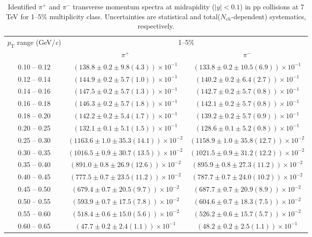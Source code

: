\begin{table}
\caption{Identified $\pi^{+}$ and $\pi^{-}$  transverse momentum spectra at midrapidity ($|y|<0.1$) in pp collisions at 7 TeV for 1--5\% multiplicity class. Uncertainties are statistical and total($N_{ch}$-dependent) systematics, respectively.}
\label{tab:PionPlus_PionMinus_1to5}
\begin{center}
\begin{tabular}{ c | c c }
\hline
\multirow{2}{*}{$p_{\mathrm{T}}$ range (GeV/\textit{c})} & \multicolumn{2}{c}{1--5\%} \\ & $\pi^{+}$& $\pi^{-}$\\ 
\hline
0.10 -- 0.12 & $(138.8\pm0.2\pm9.8(4.3))\times10^{-1}$ & $(133.8\pm0.2\pm10.5(6.9))\times10^{-1}$ \\ 
0.12 -- 0.14 & $(144.9\pm0.2\pm5.7(1.0))\times10^{-1}$ & $(140.2\pm0.2\pm6.4(2.7))\times10^{-1}$ \\ 
0.14 -- 0.16 & $(147.5\pm0.2\pm5.7(1.3))\times10^{-1}$ & $(142.7\pm0.2\pm5.7(0.8))\times10^{-1}$ \\ 
0.16 -- 0.18 & $(146.3\pm0.2\pm5.7(1.8))\times10^{-1}$ & $(142.1\pm0.2\pm5.7(0.8))\times10^{-1}$ \\ 
0.18 -- 0.20 & $(142.2\pm0.2\pm5.4(1.7))\times10^{-1}$ & $(139.2\pm0.2\pm5.7(0.9))\times10^{-1}$ \\ 
0.20 -- 0.25 & $(132.1\pm0.1\pm5.1(1.5))\times10^{-1}$ & $(128.6\pm0.1\pm5.2(0.8))\times10^{-1}$ \\ 
0.25 -- 0.30 & $(1163.6\pm1.0\pm35.3(14.1))\times10^{-2}$ & $(1158.9\pm1.0\pm35.8(12.7))\times10^{-2}$ \\ 
0.30 -- 0.35 & $(1016.5\pm0.9\pm30.7(13.5))\times10^{-2}$ & $(1021.5\pm0.9\pm31.2(12.2))\times10^{-2}$ \\ 
0.35 -- 0.40 & $(891.0\pm0.8\pm26.9(12.6))\times10^{-2}$ & $(895.9\pm0.8\pm27.3(11.2))\times10^{-2}$ \\ 
0.40 -- 0.45 & $(777.5\pm0.7\pm23.5(11.2))\times10^{-2}$ & $(787.7\pm0.7\pm24.0(10.2))\times10^{-2}$ \\ 
0.45 -- 0.50 & $(679.4\pm0.7\pm20.5(9.7))\times10^{-2}$ & $(687.7\pm0.7\pm20.9(8.9))\times10^{-2}$ \\ 
0.50 -- 0.55 & $(593.9\pm0.7\pm17.5(7.8))\times10^{-2}$ & $(604.6\pm0.7\pm18.3(7.5))\times10^{-2}$ \\ 
0.55 -- 0.60 & $(518.4\pm0.6\pm15.0(5.6))\times10^{-2}$ & $(526.2\pm0.6\pm15.7(5.7))\times10^{-2}$ \\ 
0.60 -- 0.65 & $(47.7\pm0.2\pm2.4(1.1))\times10^{-1}$ & $(48.2\pm0.2\pm2.5(1.1))\times10^{-1}$ \\ 

\end{tabular}
\end{center}
\end{table}
